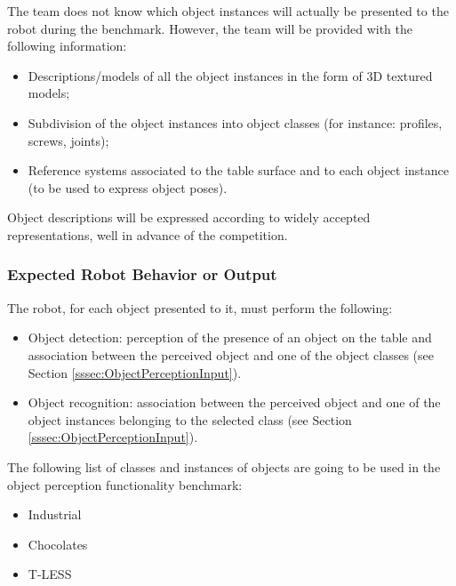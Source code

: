 The team does not know which object instances will actually be presented to the robot during the benchmark. 
However, the team will be provided with the following information:

\begin{itemize}
\item Descriptions/models of all the object instances in the form of 3D textured models;
\item Subdivision of the object instances into object classes (for instance: profiles, screws, joints);
\item Reference systems associated to the table surface and to each object instance (to be used to express object poses).
\end{itemize}

Object descriptions will be expressed according to widely accepted representations, well in advance of the competition. 

\subsubsection{Expected Robot Behavior or Output}
\label{sssec:ObjectPerceptionOutput}

The robot, for each object presented to it, must perform the following:

\begin{itemize}
\item Object detection: perception of the presence of an object on the table and association between the perceived object and one of the object classes (see Section \ref{sssec:ObjectPerceptionInput}).
\item Object recognition: association between the perceived object and one of the object instances belonging to the selected class (see Section \ref{sssec:ObjectPerceptionInput}).

\end{itemize}
The following list of classes and instances of objects are going to be used in the object perception functionality benchmark:
\begin{itemize}
    \item Industrial

    \item Chocolates

    \item T-LESS

\end{itemize}

